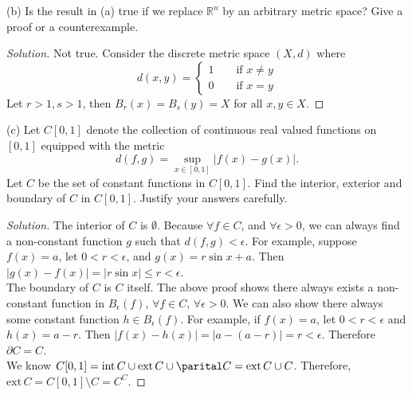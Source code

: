\documentclass[11pt,a4paper]{amsart}
\def\R{{\mathbb R}}
\def\interior{\mathrm{int\,}}
\def\exterior{\mathrm{ext\,}}
\begin{document}
\medskip

(b) Is the result in (a) true if we replace $\R^n$ by an arbitrary metric space?
Give a proof or a counterexample.

\begin{proof}[Solution]
Not true. Consider the discrete metric space $(X,d)$ where
$$
d(x,y) =
\begin{cases}
  1 \qquad\textrm{if } x \neq y\\
  0 \qquad\textrm{if } x=y
\end{cases}
$$
Let $r>1, s>1$, then $B_r(x) = B_s(y) = X$ for all $x,y \in X$.
\end{proof}

\medskip

(c) Let $C[0,1]$ denote the collection of continuous real valued functions on $[0,1]$
equipped with the metric
$$ d(f,g)= \sup_{x\in[0,1]} |f(x)-g(x)|. $$
Let $C$ be the set of constant functions in $C[0,1]$.
Find the interior, exterior and boundary of $C$ in $C[0,1]$.
Justify your answers carefully.

\begin{proof}[Solution]
The interior of $C$ is $\emptyset$. Because $\forall f \in C$, and $\forall \epsilon > 0$,
we can always find a non-constant function $g$ such that $d(f,g) < \epsilon$.
For example, suppose $f(x) = a$, let $0 < r < \epsilon$, and
$g(x) = r\sin x + a$. Then $|g(x) - f(x)| = |r\sin x| \leq r < \epsilon$. \\

The boundary of $C$ is $C$ itself. The above proof shows there always exists a
non-constant function in $B_{\epsilon}(f)$, $\forall f \in C$, $\forall \epsilon > 0$.
We can also show there always some constant function $h \in B_{\epsilon}(f)$.
For example, if $f(x)=a$, let $0 < r < \epsilon$ and $h(x)=a-r$. Then
$|f(x)-h(x)|=|a-(a-r)|=r < \epsilon$. Therefore $\partial C = C$.\\

We know $C[0,1] = \interior{C} \cup \exterior{C} \cup \parital C = \exterior{C} \cup C$.
Therefore, $\exterior{C} = C[0,1]\setminus C = C^{C}$.

\end{proof}
\end{document}
